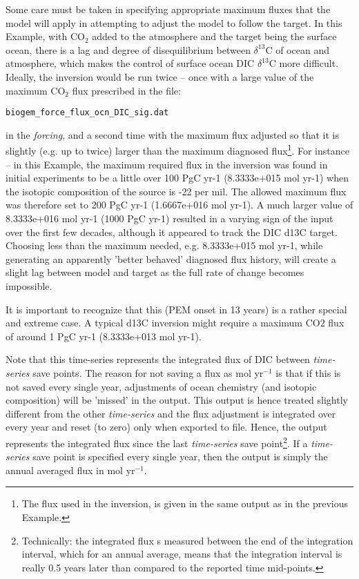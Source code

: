 \documentclass[10pt,twoside]{article}
\begin{document}
Some care must be taken in specifying appropriate maximum fluxes that the model will apply in attempting to adjust the model to follow the target. In this Example, with CO$_{2}$ added to the atmosphere and the target being the surface ocean, there is a lag and degree of disequilibrium between $\delta^{13}$C of ocean and atmosphere, which makes the control of surface ocean DIC $\delta^{13}$C more difficult. Ideally, the inversion would be run twice -- once with a large value of the maximum CO$_{2}$ flux prescribed in the file:
\vspace{-5pt}\begin{verbatim}
biogem_force_flux_ocn_DIC_sig.dat
\end{verbatim}\vspace{-5pt}
in the \textit{forcing},  and a second time with the maximum flux adjusted so that it is slightly (e.g. up to twice) larger than the maximum diagnosed flux\footnote{The flux used in the inversion, is given in the same output as in the previous Example. }. 
For instance -- in this Example, the maximum required flux in the inversion was found in initial experiments to be a little over 100 PgC yr-1 (8.3333e+015 mol yr-1) when the isotopic composition of the source is -22 per mil. The allowed maximum flux was therefore set to 200 PgC yr-1 (1.6667e+016 mol yr-1). A much larger value of 8.3333e+016 mol yr-1 (1000 PgC yr-1) resulted in a varying sign of the input over the first few decades, although it appeared to track the DIC d13C target. Choosing less than the maximum needed, e.g. 8.3333e+015 mol yr-1, while generating an apparently 'better behaved' diagnosed flux history, will create a slight lag between model and target as the full rate of change becomes impossible.

It is important to recognize that this (PEM onset in 13 years) is a rather special and extreme case. A typical d13C inversion might require a maximum CO2 flux of around 1 PgC yr-1 (8.3333e+013 mol yr-1).

Note that this time-series represents the integrated flux of DIC between \textit{time-series} save points. The reason for not saving a flux as mol yr$^{-1}$ is that if this is not saved every single year, adjustments of ocean chemistry (and isotopic composition) will be 'missed' in the output. This output is hence treated slightly different from the other \textit{time-series} and the flux adjustment is integrated over every year and reset (to zero) only when exported to file. Hence, the output represents the integrated flux since the last \textit{time-series} save point\footnote{Technically: the integrated flux s measured between the end of the integration interval, which for an annual average, means that the integration interval is really 0.5 years later than compared to the reported time mid-points.}. If a \textit{time-series} save point is specified every single year, then the output is simply the annual averaged flux in mol yr$^{-1}$.
\end{document}
